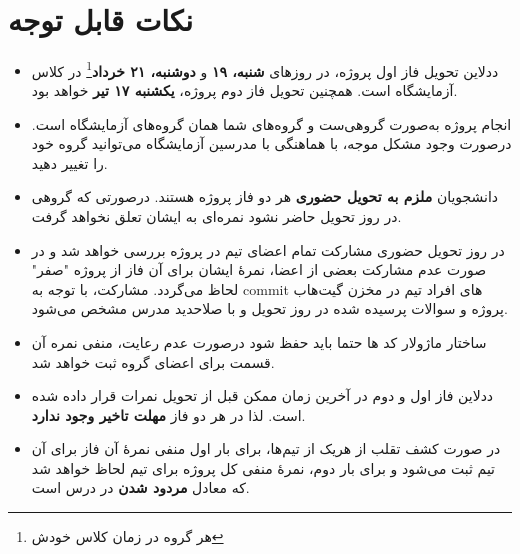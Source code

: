 \documentclass[]{article}
\begin{document}
\newpage
\pagestyle{fancy}
\fancyhf{}
\fancyfoot{}
\cfoot{\thepage}
\renewcommand{\headrulewidth}{2pt}



\tableofcontents

\newpage

 \Large \textbf{\\
}

\section*{{\titr نکات قابل توجه}}
\begin{itemize}
	
\item 
ددلاین تحویل فاز اول پروژه، در روز‌های \textbf{شنبه، ۱۹} و \textbf{دوشنبه، ۲۱ خرداد}\footnote{هر گروه در زمان کلاس خودش} در کلاس آزمایشگاه است. همچنین تحویل فاز دوم پروژه، \textbf{یکشنبه ۱۷ تیر} خواهد بود.
	
\item
انجام پروژه به‌صورت گروهی‌ست و گروه‌های شما همان گروه‌های آزمایشگاه است. درصورت وجود مشکل موجه، با هماهنگی با مدرسین آزمایشگاه می‌توانید گروه خود را تغییر دهید.


\item
دانشجویان \textbf{ملزم به تحویل حضوری} هر دو فاز پروژه هستند. درصورتی که گروهی در روز تحویل حاضر نشود نمره‌ای به ایشان تعلق نخواهد گرفت.

\item
در روز تحویل حضوری مشارکت تمام اعضای تیم در پروژه بررسی خواهد‌ شد و در صورت عدم مشارکت بعضی از اعضا، نمرهٔ ایشان برای آن فاز از پروژه "صفر" لحاظ می‌گردد. مشارکت، با توجه به commit های افراد تیم در مخزن گیت‌هاب پروژه و سوالات پرسیده شده در روز تحویل و با صلاحدید مدرس مشخص می‌شود.

\item 
ساختار ماژولار کد ها حتما باید حفظ شود درصورت عدم رعایت، منفی نمره آن قسمت برای اعضای گروه ثبت خواهد شد.

\item
ددلاین فاز اول و دوم در آخرین زمان ممکن قبل از تحویل نمرات قرار داده شده است. لذا در هر دو فاز \textbf{مهلت تاخیر وجود ندارد}.

\item
در صورت کشف تقلب از هریک از تیم‌ها، برای بار اول منفی نمرهٔ آن فاز برای آن تیم ثبت می‌شود و برای بار دوم، نمرهٔ منفی کل پروژه برای تیم لحاظ خواهد‌ شد که معادل \textbf{مردود شدن} در درس است.
\end{itemize}
\end{document}
